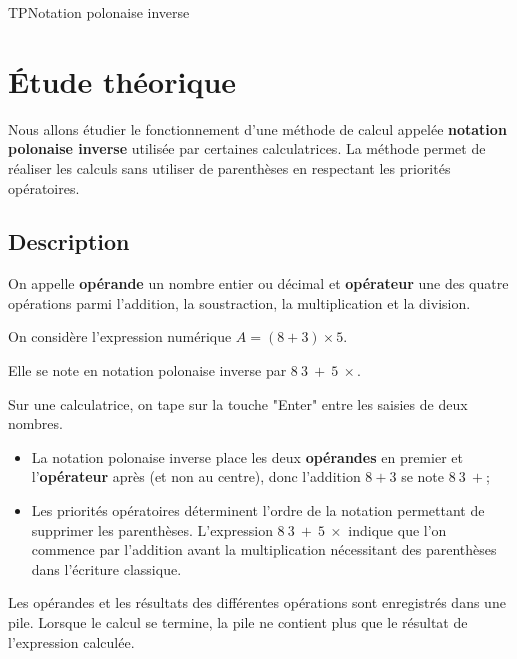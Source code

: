 \documentclass[11pt,a4paper]{article}
\begin{document}
\begin{NSI}
{TP}{Notation polonaise inverse}
\end{NSI}


\section{Étude théorique}

Nous allons étudier le fonctionnement d'une méthode de calcul appelée \textbf{notation polonaise inverse} utilisée par certaines calculatrices. La méthode permet de réaliser les calculs sans utiliser de parenthèses en respectant les priorités opératoires.

\subsection*{Description}

On appelle \textbf{opérande} un nombre entier ou décimal et \textbf{opérateur} une des quatre opérations parmi l'addition, la soustraction, la multiplication et la division.\medskip

On considère l'expression numérique $A=(8+3) \times 5$.\medskip

Elle se note en notation polonaise inverse par $8~3~+~5~\times$.\medskip

Sur une calculatrice, on tape sur la touche "Enter" entre les saisies de deux nombres.\medskip

\begin{itemize}
\item La notation polonaise inverse place les deux \textbf{opérandes} en premier et l'\textbf{opérateur} après (et non au centre), donc l'addition $8+3$ se note $8~3~+$;
\item Les priorités opératoires déterminent l'ordre de la notation permettant de supprimer les parenthèses. L'expression $8~3~+~5~\times$ indique que l'on commence par l'addition avant la multiplication nécessitant des parenthèses dans l'écriture classique.
\end{itemize}

Les opérandes et les résultats des différentes opérations sont enregistrés dans une pile. Lorsque le calcul se termine, la pile ne contient plus que le résultat de l'expression calculée. 
\end{document}
